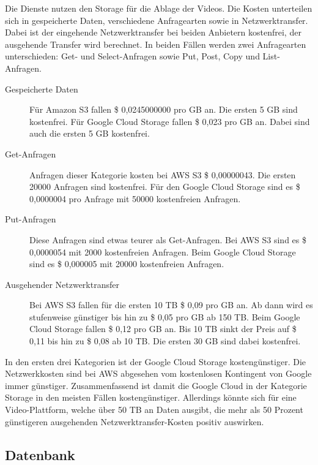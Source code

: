 Die Dienste nutzen den Storage für die Ablage der Videos. Die Kosten unterteilen sich in gespeicherte Daten, verschiedene Anfragearten sowie in Netzwerktransfer. Dabei ist der eingehende Netzwerktransfer bei beiden Anbietern kostenfrei, der ausgehende Transfer wird berechnet. In beiden Fällen werden zwei Anfragearten unterschieden: Get- und Select-Anfragen sowie Put, Post, Copy und List-Anfragen.

\begin{description}
  \item[Gespeicherte Daten] Für Amazon S3 fallen \$ 0,0245000000 pro GB an. Die ersten 5 GB sind kostenfrei. Für Google Cloud Storage fallen \$ 0,023 pro GB an. Dabei sind auch die ersten 5 GB kostenfrei.
  \item[Get-Anfragen] Anfragen dieser Kategorie kosten bei \ac{AWS} S3 \$ 0,00000043. Die ersten 20000 Anfragen sind kostenfrei. Für den Google Cloud Storage sind es \$ 0,0000004 pro Anfrage mit 50000 kostenfreien Anfragen.
  \item[Put-Anfragen] Diese Anfragen sind etwas teurer als Get-Anfragen. Bei \ac{AWS} S3 sind es \$ 0,0000054 mit 2000 kostenfreien Anfragen. Beim Google Cloud Storage sind es \$ 0,000005 mit 20000 kostenfreien Anfragen.
  \item[Ausgehender Netzwerktransfer] Bei \ac{AWS} S3 fallen für die ersten 10 TB \$ 0,09 pro GB an. Ab dann wird es stufenweise günstiger bis hin zu \$ 0,05 pro GB ab 150 TB. Beim Google Cloud Storage fallen \$ 0,12 pro GB an. Bis 10 TB sinkt der Preis auf \$ 0,11 bis hin zu \$ 0,08 ab 10 TB. Die ersten 30 GB sind dabei kostenfrei.
\end{description}

In den ersten drei Kategorien ist der Google Cloud Storage kostengünstiger. Die Netzwerkkosten sind bei \ac{AWS} abgesehen vom kostenlosen Kontingent von Google immer günstiger. Zusammenfassend ist damit die Google Cloud in der Kategorie Storage in den meisten Fällen kostengünstiger. Allerdings könnte sich für eine Video-Plattform, welche über 50 TB an Daten ausgibt, die mehr als 50 Prozent günstigeren ausgehenden Netzwerktransfer-Kosten positiv auswirken.

\subsection{Datenbank}

